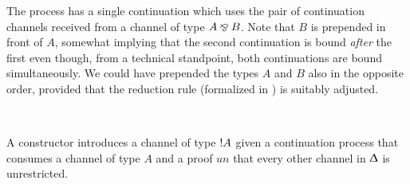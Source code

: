 \begin{AgdaAlign}
The  process has a single continuation which uses
the pair of continuation channels received from a channel of type $A \mathbin\bindnasrepma B$.
Note that $B$ is prepended in front of $A$, somewhat implying that the second
continuation is bound \emph{after} the first even though, from a technical
standpoint, both continuations are bound simultaneously. We could have prepended
the types $A$ and $B$ also in the opposite order, provided that the reduction
rule \RFork (formalized in ) is suitably adjusted.

\begin{code}%
%
\>[3]%
\>[13]\AgdaSymbol{:}%
\>[1640I]\AgdaSpace{}%
\AgdaSpace{}%
\AgdaSymbol{\}}\AgdaSpace{}%
\AgdaSymbol{(}\AgdaSpace{}%
\AgdaSymbol{:}\AgdaSpace{}%
\AgdaSpace{}%
\AgdaSpace{}%
\AgdaSpace{}%
\AgdaSpace{}%
\AgdaOperator{\AgdaFunction{,}}\AgdaSpace{}%
\AgdaSymbol{)}\AgdaSpace{}%
\AgdaSymbol{(}\AgdaSpace{}%
\AgdaSymbol{:}\AgdaSpace{}%
\AgdaSpace{}%
\AgdaSymbol{)}\AgdaSpace{}%
\<%
\\
\>[.][@{}l@{}]\<[1640I]%
\>[15]\AgdaSpace{}%
\AgdaSymbol{(}\AgdaSpace{}%
\AgdaSpace{}%
\AgdaSymbol{)}\AgdaSpace{}%
\AgdaSpace{}%
\AgdaSpace{}%
\<%
\end{code}

A  constructor introduces a channel of type
$\OfCourse A$ given a continuation process that consumes a channel of type $A$
and a proof $\mathit{un}$ that every other channel in $\Updelta$ is
unrestricted.


\end{AgdaAlign}
